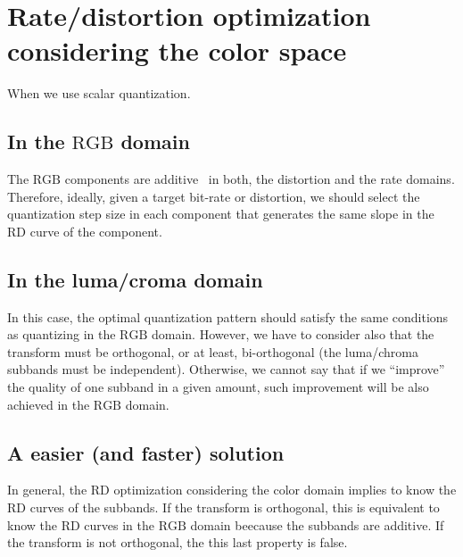 \section{Rate/distortion optimization considering the color space}

When we use scalar quantization.

\subsection{In the $\text{RGB}$ domain}

The $\text{RGB}$ components are additive~\cite{burger2016digital} in
both, the distortion and the rate domains. Therefore, ideally, given a
target bit-rate or distortion, we should select the quantization step
size in each component that generates the same slope in the RD curve
of the component.

\subsection{In the luma/croma domain}

In this case, the optimal quantization pattern should satisfy the same
conditions as quantizing in the $\text{RGB}$ domain. However, we have
to consider also that the transform must be orthogonal, or at least,
bi-orthogonal (the luma/chroma subbands must be
independent). Otherwise, we cannot say that if we ``improve'' the
quality of one subband in a given amount, such improvement will be
also achieved in the $\text{RGB}$ domain.

\subsection{A easier (and faster) solution}

In general, the RD optimization considering the color domain implies
to know the RD curves of the subbands. If the transform is orthogonal,
this is equivalent to know the RD curves in the $\text{RGB}$ domain
beecause the subbands are additive. If the transform is not
orthogonal, the this last property is false.

